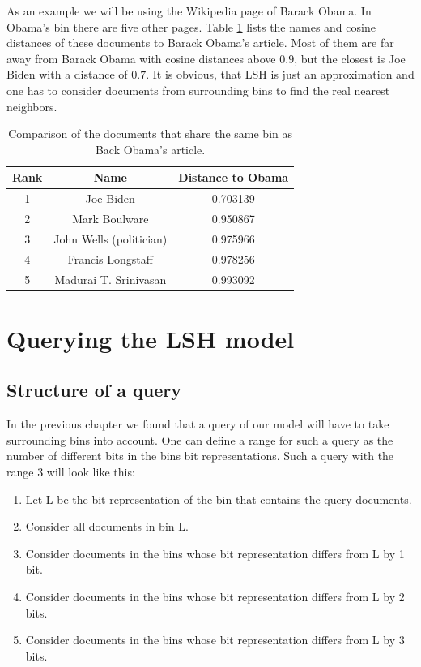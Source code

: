 \documentclass[12pt]{scrreprt}
\begin{document}
As an example we will be using the Wikipedia page of Barack Obama. In Obama's bin there are five other pages. Table \ref{tab:compare_top_words} lists the names and cosine distances of these documents to Barack Obama's article. Most of them are far away from Barack Obama with cosine distances above $0.9$, but the closest is Joe Biden with a distance of $0.7$. It is obvious, that LSH is just an approximation and one has to consider documents from surrounding bins to find the real nearest neighbors.

\begin{table}[H]
  \caption{Comparison of the documents that share the same bin as Back Obama's article.}
  \label{tab:compare_top_words}
  \begin{center}
    \begin{tabular}{| c | c | c |}
      \hline
      \textbf{Rank} & \textbf{Name} & \textbf{Distance to Obama}\\
      \hline
      \hline
      1 & Joe Biden & 0.703139 \\ \hline
      2 & Mark Boulware & 0.950867 \\ \hline
      3 & John Wells (politician) & 0.975966 \\ \hline
      4 & Francis Longstaff & 0.978256 \\ \hline
      5 & Madurai T. Srinivasan & 0.993092 \\ \hline
    \end{tabular}	
  \end{center}
\end{table}

\chapter{Querying the LSH model}
\section{Structure of a query}
In the previous chapter we found that a query of our model will have to take surrounding bins into account. One can define a range for such a query as the number of different bits in the bins bit representations. Such a query with the range 3 will look like this:\\
\begin{center}
\begin{enumerate}
\item[1.] Let L be the bit representation of the bin that contains the query documents.
\item[2.] Consider all documents in bin L.
\item[3.] Consider documents in the bins whose bit representation differs from L by 1 bit.
\item[4.] Consider documents in the bins whose bit representation differs from L by 2 bits.
\item[5.] Consider documents in the bins whose bit representation differs from L by 3 bits.
\end{enumerate}
\end{center}
\end{document}
